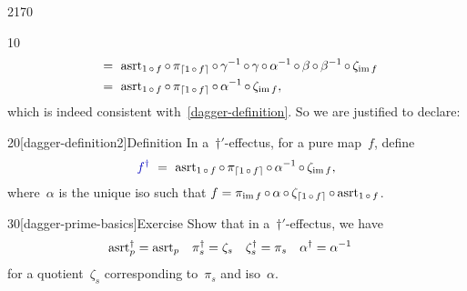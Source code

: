 \begin{parsec}{2170}
\begin{point}{10}
\begin{align*}
    &\ = \ \mathrm{asrt}_{1 \mathop{\circ} f}\mathop{\circ} \pi_{\left\lceil1 \mathop{\circ} f\right\rceil}
                \mathop{\circ} \gamma^{-1} \mathop{\circ} \gamma \mathop{\circ} \alpha^{-1} \mathop{\circ} \beta 
                \mathop{\circ} \beta^{-1}\mathop{\circ} \zeta_{\operatorname{im} f} \\
    &\ = \ \mathrm{asrt}_{1 \mathop{\circ} f}\mathop{\circ} \pi_{\left\lceil1 \mathop{\circ} f\right\rceil}
                \mathop{\circ} \alpha^{-1} \mathop{\circ} \zeta_{\operatorname{im} f},
\end{align*}
which is indeed consistent with~\eqref{dagger-definition}.
So we are justified to declare:
\end{point}
\begin{point}{20}[dagger-definition2]{Definition}%
In a~$\dagger'$-effectus, for a pure map~$f$, define
\begin{equation*}
    \Define{f^\dagger}
        \ =\  \asrt_{1 \after f} \after
    \pi_{\ceil{1\after f}} \after
    \alpha^{-1} \after
    \zeta_{\IM f},
\end{equation*}
where~$\alpha$ is the unique iso such that
$f  =  \pi_{\operatorname{im} f} \mathop{\circ} \alpha \mathop{\circ} \zeta_{\left\lceil1\mathop{\circ} f\right\rceil}
            \mathop{\circ} \mathrm{asrt}_{1 \mathop{\circ} f}$.
\end{point}
\begin{point}{30}[dagger-prime-basics]{Exercise}%
Show that in a~$\dagger'$-effectus,
    we have
\begin{align*}
    \mathrm{asrt}_p^\dagger &= \mathrm{asrt}_p &
    \pi_s^\dagger &= \zeta_s &
    \zeta_s^\dagger &= \pi_s &
    \alpha^\dagger &= \alpha^{-1}
\end{align*}
for a quotient~$\zeta_s$ corresponding to~$\pi_s$
and iso~$\alpha$.
\end{point}
\end{parsec}

